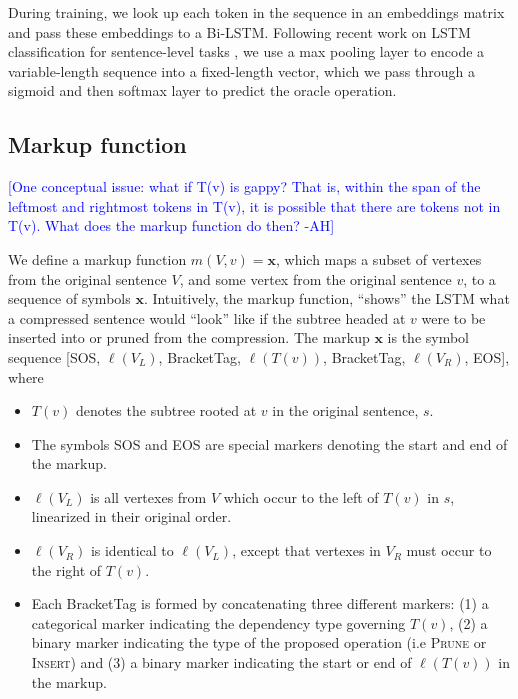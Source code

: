 \documentclass[11pt,a4paper]{article}
\newcommand{\ahcomment}[1]{\textcolor{blue}{[#1 -AH]}}
\begin{document}

During training, we look up each token in the sequence in an embeddings matrix and pass these embeddings to a Bi-LSTM. Following recent work on LSTM classification for sentence-level tasks \cite{D17-1070}, we use a max pooling layer to encode a variable-length sequence into a fixed-length vector, which we pass through a sigmoid and then softmax layer to predict the oracle 
operation. %

\pagebreak

\subsection{Markup function}

\ahcomment{One conceptual issue: what if T(v) is gappy?  That is, within the span of the leftmost and rightmost tokens in T(v), it is possible that there are tokens not in T(v).  What does the markup function do then?}

We define a markup function $m(V,v)=\bm{x}$, which maps a subset of vertexes from the original sentence $V$, and some vertex from the original sentence $v$, to a sequence of symbols $\bm{x}$. Intuitively, the markup function, ``shows'' the LSTM what a compressed sentence would ``look'' like if the subtree headed at $v$ were to be inserted into or pruned from the compression. The markup $\bm{x}$ is the symbol sequence [SOS, $\ell(V_L)$, BracketTag, $\ell(T(v))$, BracketTag, $\ell(V_R)$, EOS], where

\begin{itemize}
\item{$T(v)$ denotes the subtree rooted at $v$ in the original sentence, $s$.}
\item{The symbols SOS and EOS are special markers denoting the start and end of the markup.}
\item{$\ell(V_L)$ is all vertexes from $V$ which occur to the left of $T(v)$ in $s$, linearized in their original order.}
\item{$\ell(V_R)$ is identical to $\ell(V_L)$, except that vertexes in $V_R$ must occur to the right of $T(v)$.}
\item{Each BracketTag is formed by concatenating three different markers: (1) a categorical marker indicating the dependency type governing $T(v)$, (2) a binary marker indicating the type of the proposed operation (i.e \textsc{Prune} or \textsc{Insert}) and (3) a binary marker indicating the start or end of $\ell (T(v))$ in the markup.}
\end{itemize}
\end{document}
